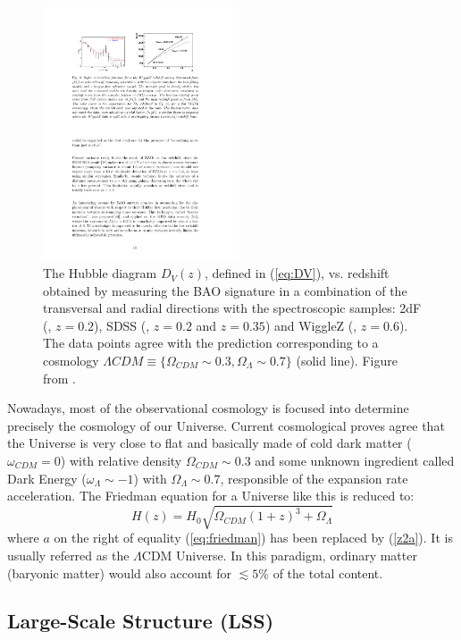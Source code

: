 \begin{figure}
\centering
\includegraphics[height=75mm]{./plots/dv_bao.pdf}
\caption{The Hubble diagram $D_V(z)$, defined in (\ref{eq:DV}), vs. redshift obtained by measuring the BAO signature in a combination of the transversal and radial directions with the spectroscopic samples: 2dF (\citet{Colless2001}, $z=0.2$), SDSS (\citet{York2000}, $z=0.2$ and $z=0.35$) and WiggleZ (\citet{Drinkwater2010}, $z=0.6$). The data points agree with the prediction corresponding to a cosmology $\Lambda CDM \equiv\lbrace \Omega_{CDM} \sim 0.3, \Omega_\Lambda \sim 0.7 \rbrace$ (solid line). Figure from \citet{Astier2012}.}
\label{fig:DV_bao}
\end{figure}

Nowadays, most of the observational cosmology is focused into determine precisely the cosmology of our Universe. Current cosmological proves agree that the Universe is very close to flat and basically made of cold dark matter ($\omega_{CDM} = 0$) with relative density $\Omega_{CDM} \sim 0.3$ and some unknown ingredient called Dark Energy ($\omega_\Lambda \sim -1$) with $\Omega_\Lambda \sim 0.7$, responsible of the expansion rate acceleration. The Friedman equation for a Universe like this is reduced to:
\begin{equation}
H(z) = H_0 \sqrt{\Omega_{CDM}(1+z)^3 + \Omega_\Lambda}
\end{equation}
where $a$ on the right of equality (\ref{eq:friedman}) has been replaced by (\ref{z2a}). It is usually referred as the $\Lambda$CDM Universe. In this paradigm, ordinary matter (baryonic matter) would also account for $\lesssim5\%$ of the total content.

\subsection{Large-Scale Structure (LSS)}
\label{sec:lss}

